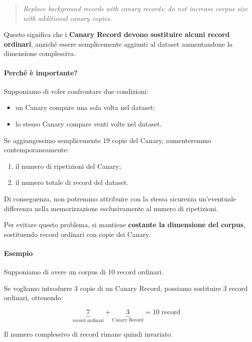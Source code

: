 \begin{quote}
    \textit{Replace background records with canary records;
    do not increase corpus size with additional canary copies.}
\end{quote}

Questo significa che i \textbf{Canary Record devono
sostituire alcuni record ordinari}, anziché essere
semplicemente aggiunti al dataset aumentandone
la dimensione complessiva.

\paragraph{Perché è importante?}

Supponiamo di voler confrontare due condizioni:
\begin{itemize}
    \item un Canary compare una sola volta nel dataset;
    \item lo stesso Canary compare venti volte nel dataset.
\end{itemize}

Se aggiungessimo semplicemente 19 copie del Canary,
aumenteremmo contemporaneamente:
\begin{enumerate}
    \item il numero di ripetizioni del Canary;
    \item il numero totale di record del dataset.
\end{enumerate}

Di conseguenza, non potremmo attribuire con la
stessa sicurezza un'eventuale differenza nella
memorizzazione esclusivamente al numero di ripetizioni.

Per evitare questo problema, si mantiene
\textbf{costante la dimensione del corpus},
sostituendo record ordinari con copie dei Canary.

\paragraph{Esempio}

Supponiamo di avere un corpus di 10 record ordinari.

Se vogliamo introdurre 3 copie di un Canary Record,
possiamo sostituire 3 record ordinari, ottenendo:

\[
\underbrace{7}_{\text{record ordinari}}
+
\underbrace{3}_{\text{Canary Record}}
=
\boxed{10 \text{ record}}
\]

Il numero complessivo di record rimane quindi invariato.

